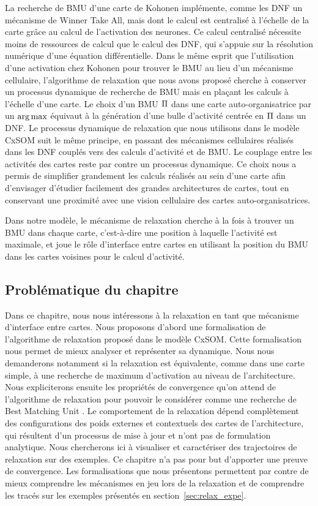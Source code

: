 \documentclass[../main]{subfiles}
\begin{document}
La recherche de BMU d'une carte de Kohonen implémente, comme les DNF un mécanisme de Winner Take All, mais dont le calcul est centralisé à l'échelle de la carte grâce au calcul de l'activation des neurones.
Ce calcul centralisé nécessite moins de ressources de calcul que le calcul des DNF, qui s'appuie sur la résolution numérique d'une équation différentielle.
Dans le même esprit que l'utilisation d'une activation chez Kohonen pour trouver le BMU au lieu d'un mécanisme cellulaire, l'algorithme de relaxation que nous avons proposé cherche à conserver un processus dynamique de recherche de BMU mais en plaçant les calculs à l'échelle d'une carte. 
Le choix d'un BMU $\Pi$ dans une carte auto-organisatrice par un $\operatorname*{arg\,max}$ équivaut à la génération d'une bulle d'activité centrée en $\Pi$ dans un DNF. 
Le processus dynamique de relaxation que nous utilisons dans le modèle CxSOM suit le même principe, en passant des mécanismes cellulaires réalisés dans les DNF couplés vers des calculs d'activité et de BMU. Le couplage entre les activités des cartes reste par contre un processus dynamique.
Ce choix nous a permis de simplifier grandement les calculs réalisés au sein d'une carte afin d'envisager d'étudier facilement des grandes architectures de cartes, tout en conservant une proximité avec une vision cellulaire des cartes auto-organisatrices.

Dans notre modèle, le mécanisme de relaxation cherche à la fois à trouver un BMU dans chaque carte, c'est-à-dire une position à laquelle l'activité est maximale, et joue le rôle d'interface entre cartes en utilisant la position du BMU dans les cartes voisines pour le calcul d'activité. 

\subsection{Problématique du chapitre}

Dans ce chapitre, nous nous intéressons à la relaxation en tant que mécanisme d'interface entre cartes.
Nous proposons d'abord une formalisation de l'algorithme de relaxation proposé dans le modèle CxSOM.
Cette formalisation nous permet de mieux analyser et représenter sa dynamique. 
Nous nous demanderons notamment si la relaxation est équivalente, comme dans une carte simple, à une recherche de maximum d'activation au niveau de l'architecture.
Nous expliciterons ensuite les propriétés de convergence qu'on attend de l'algorithme de relaxation pour pouvoir le considérer comme une recherche de \og Best Matching Unit \fg{}.
Le comportement de la relaxation dépend complètement des configurations des poids externes et contextuels des cartes de l'architecture, qui résultent d'un processus de mise à jour et n'ont pas de formulation analytique. Nous chercherons ici à visualiser et caractériser des trajectoires de relaxation sur des exemples.
Ce chapitre n'a pas pour but d'apporter une preuve de convergence. 
Les formalisations que nous présentons permettent par contre de mieux comprendre les mécanismes en jeu lors de la relaxation et de comprendre les tracés sur les exemples présentés en section~\ref{sec:relax_expe}.
\end{document}
